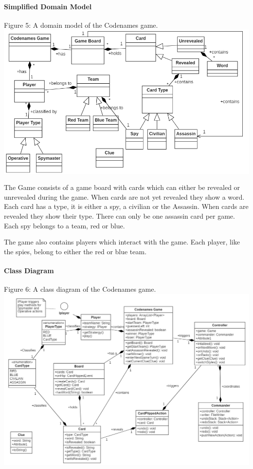 \documentclass[10pt, a4paper]{article}
\begin{document}
		\paragraph{Simplified Domain Model}
			\begin{center}
				Figure 5: A domain model of the Codenames game. 
				\includegraphics[scale=.90]{domain_model_final.png}
				
			\end{center}
		The Game consists of a game board with cards which can either be revealed or unrevealed during the game. When cards are not yet revealed they show a word. Each card has a type, it is either a spy, a civilian or the Assassin. When cards are revealed they show their type. There can only be one assassin card per game. Each spy belongs to a team, red or blue. 
		
		The game also contains players which interact with the game. Each player, like the spies, belong to either the red or blue team. 
			\pagebreak
			\paragraph{Class Diagram}
				\begin{center}
				Figure 6: A class diagram of the Codenames game. 
				\includegraphics[scale=.60]{class_diagram_final.png}
				
			\end{center}
			
\end{document}
